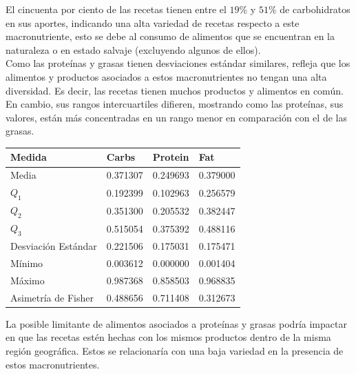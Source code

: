 \documentclass[12pt,a4paper]{article}
\begin{document}
            El cincuenta por ciento de las recetas tienen entre el $19\%$ y $51\%$ 
            de carbohidratos en sus aportes, indicando una alta variedad de recetas 
            respecto a este macronutriente, esto se debe al consumo de alimentos que 
            se encuentran en la naturaleza o en estado salvaje (excluyendo algunos 
            de ellos).\\

            Como las proteínas y grasas tienen desviaciones estándar similares, refleja 
            que los alimentos y productos asociados a estos macronutrientes no tengan 
            una alta diversidad. Es decir, las recetas tienen muchos productos y alimentos 
            en común. En cambio, sus rangos intercuartiles difieren, mostrando como 
            las proteínas, sus valores, están más concentradas en un rango menor en 
            comparación con el de las grasas.

            \begin{center}
                \begin{tabular}{l|lll}
                    \toprule
                        Medida & Carbs & Protein & Fat \\
                    \midrule
                        Media               & 0.371307 & 0.249693 & 0.379000  \\
                        $Q_1$               & 0.192399 & 0.102963 & 0.256579  \\
                        $Q_2$               & 0.351300 & 0.205532 & 0.382447  \\
                        $Q_3$               & 0.515054 & 0.375392 & 0.488116  \\
                        Desviación Estándar & 0.221506 & 0.175031 & 0.175471  \\
                        Mínimo              & 0.003612 & 0.000000 & 0.001404  \\
                        Máximo              & 0.987368 & 0.858503 & 0.968835  \\
                        Asimetría de Fisher & 0.488656 & 0.711408 & 0.312673  \\
                    \bottomrule
                \end{tabular}
            \end{center}

            La posible limitante de alimentos asociados a proteínas	y grasas 
            podría impactar en que las recetas estén hechas con los mismos productos 
            dentro de la misma región geográfica. Estos se relacionaría con una 
            baja variedad en la presencia de estos macronutrientes.\\
\end{document}
